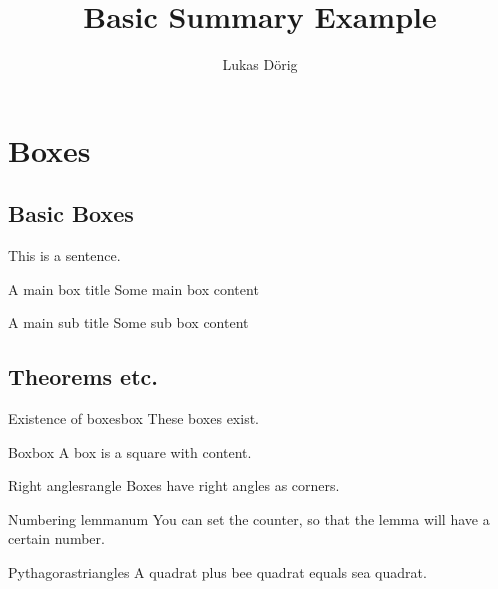 \def\lutilpath{../..}



\title{Basic Summary Example}
\author{Lukas Dörig}



\maketitle

\section{Boxes}

\subsection{Basic Boxes}

This is a sentence.

\begin{mainbox}{A main box title}
  Some main box content
\end{mainbox}

\begin{subbox}{A main sub title}
  Some sub box content
\end{subbox}

\subsection{Theorems etc.}

\begin{axiom}{Existence of boxes}{box}
  These boxes exist.
\end{axiom}

\begin{definition}{Box}{box}
  A box is a square with content.
\end{definition}

\begin{corollary}{Right angles}{rangle}
  Boxes have right angles as corners.
\end{corollary}

\begin{lemma}{Numbering lemma}{num}
  You can set the counter, so that the lemma will have a certain number.
\end{lemma}

\begin{satz}{Pythagoras}{triangles}
  A quadrat plus bee quadrat equals sea quadrat.
\end{satz}

